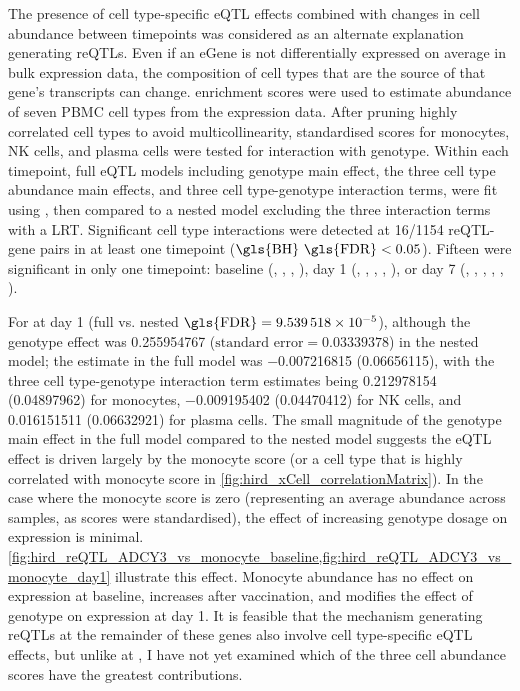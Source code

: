 The presence of cell type-specific \gls{eQTL} effects combined with changes in cell abundance between timepoints was considered as an alternate explanation generating \glspl{reQTL}.
Even if an eGene is not differentially expressed on average in bulk expression data, 
the composition of cell types that are the source of that gene's transcripts can change.
 \autocite{aran2017XCellDigitallyPortraying} enrichment scores were used to estimate abundance of seven \gls{PBMC} cell types from the expression data.
After pruning highly correlated cell types to avoid multicollinearity, standardised scores for monocytes, \gls{NK} cells, and plasma cells were tested for interaction with genotype.
Within each timepoint, full \gls{eQTL} models including genotype main effect, the three cell type abundance main effects, and three cell type-genotype interaction terms, were fit using  \autocite{ziyatdinov2018Lme4qtlLinearMixed}, 
then compared to a nested model excluding the three interaction terms with a \gls{LRT}.
Significant cell type interactions were detected at \num{16/1154} \gls{reQTL}-gene pairs in at least one timepoint ($\text{\gls{BH} \gls{FDR}} < 0.05$).
Fifteen were significant in only one timepoint:
baseline (, , , ),
day 1 (, , , , ),
or day 7 (, , , , , ).

For  at day 1 (full vs. nested $\text{\gls{FDR}} = \num{9.539518e-05}$),
although the genotype effect was \num{0.255954767} ($\text{standard error} = \num{0.03339378}$) in the nested model;
the estimate in the full model was \num{-0.007216815} (\num{0.06656115}),
with the three cell type-genotype interaction term estimates being
\num{0.212978154} (\num{0.04897962}) for monocytes,
\num{-0.009195402} (\num{0.04470412}) for \gls{NK} cells,
and \num{0.016151511} (\num{0.06632921}) for plasma cells.
The small magnitude of the genotype main effect in the full model compared to the nested model suggests the \gls{eQTL} effect is driven largely by the monocyte score (or a cell type that is highly correlated with monocyte score in \cref{fig:hird_xCell_correlationMatrix}).
In the case where the monocyte score is zero (representing an average abundance across samples, as scores were standardised), the effect of increasing genotype dosage on  expression is minimal.
\cref{fig:hird_reQTL_ADCY3_vs_monocyte_baseline,fig:hird_reQTL_ADCY3_vs_monocyte_day1} illustrate this effect.
Monocyte abundance has no effect on expression at baseline, 
increases after vaccination, and modifies the effect of genotype on expression at day 1.
It is feasible that the mechanism generating \glspl{reQTL} at the remainder of these genes also involve cell type-specific \gls{eQTL} effects, 
but unlike at , 
I have not yet examined which of the three cell abundance scores have the greatest contributions.

